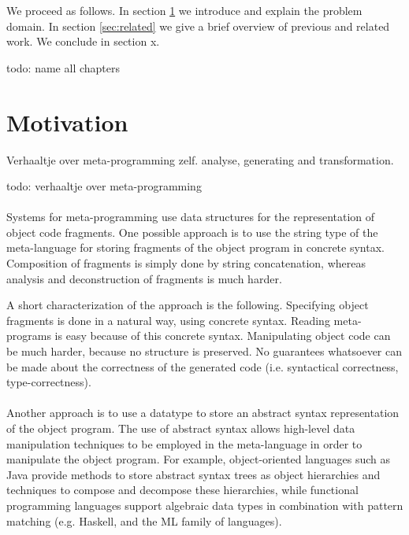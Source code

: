 \documentclass[a4paper,11pt]{article}
\begin{document}
We proceed as follows. In section \ref{sec:motivation} we introduce and explain
the problem domain. In section \ref{sec:related} we give a brief overview of
previous and related work. We conclude in section x.

todo: name all chapters


\section{Motivation}\label{sec:motivation}

Verhaaltje over meta-programming zelf. analyse, generating and transformation.

todo: verhaaltje over meta-programming

\paragraph{}

Systems for meta-programming use data structures for the representation of
object code fragments. One possible approach is to use the string type of the
meta-language for storing fragments of the object program in concrete syntax.
Composition of fragments is simply done by string concatenation, whereas
analysis and deconstruction of fragments is much harder.

A short characterization of the approach is the following. Specifying object
fragments is done in a natural way, using concrete syntax. Reading
meta-programs is easy because of this concrete syntax. Manipulating object
code can be much harder, because no structure is preserved. No guarantees
whatsoever can be made about the correctness of the generated code (i.e.
syntactical correctness, type-correctness).

\paragraph{}

Another approach is to use a datatype to store an abstract syntax representation
of the object program. The use of abstract syntax allows high-level data
manipulation techniques to be employed in the meta-language in order to
manipulate the object program. For example, object-oriented languages such
as Java provide methods to store abstract syntax trees as object hierarchies
and techniques to compose and decompose these hierarchies, while functional
programming languages support algebraic data types in combination with pattern
matching (e.g. Haskell, and the ML family of languages).
\end{document}
